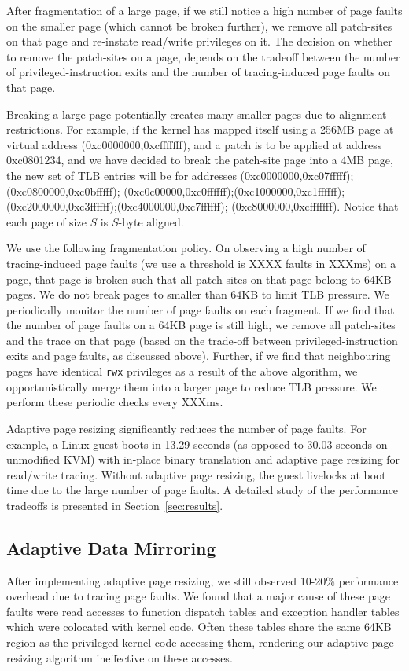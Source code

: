 \documentclass[10pt,twocolumn]{article}
\begin{document}
After fragmentation of a large page, if we still notice a high number of page faults
on the smaller page (which cannot be broken further), we remove all patch-sites
on that page and re-instate read/write privileges on it. The decision on
whether to remove the patch-sites on a page, depends on the tradeoff
between the number of privileged-instruction exits and the number of
tracing-induced page faults on that page.

Breaking a large page potentially creates
many smaller pages due to alignment restrictions.
For example, if the kernel has mapped
itself using a 256MB page at virtual address (0xc0000000,0xcfffffff), and a
patch is to be applied at address 0xc0801234, and we have decided to break
the patch-site page into a 4MB page, the new set of TLB entries will be for
addresses
(0xc0000000,0xc07fffff);(0xc0800000,0xc0bfffff);
(0xc0c00000,0xc0ffffff);(0xc1000000,0xc1ffffff);
(0xc2000000,0xc3ffffff);(0xc4000000,0xc7ffffff);
(0xc8000000,0xcfffffff). Notice that each page of size $S$ is $S$-byte
aligned.

We use the following fragmentation policy. On
observing a high number of tracing-induced page faults (we use a threshold is XXXX faults in
XXXms) on a page, that page is broken such that all patch-sites on that page
belong to 64KB pages. We do not break pages to smaller than 64KB to
limit TLB pressure. We periodically monitor the number of page faults on
each fragment. If we find that the number of page faults on a 64KB page is still high,
we remove all patch-sites and the trace on that page (based on the trade-off
between privileged-instruction exits and page faults, as discussed above).
Further, if we find that neighbouring pages have identical {\tt rwx} privileges
as a result of the above algorithm,
we opportunistically merge them into a larger page to reduce TLB pressure. We perform
these periodic checks every XXXms.

Adaptive page resizing significantly reduces the number of page faults. For
example, a Linux guest boots in 13.29 seconds (as opposed to 30.03 seconds on
unmodified KVM) with in-place binary translation
and adaptive page resizing for read/write tracing. Without adaptive page resizing,
the guest livelocks at boot time due to the large number of
page faults. A detailed study of the performance tradeoffs is presented in
Section~\ref{sec:results}.

\subsection{Adaptive Data Mirroring}
After implementing adaptive page resizing,
we still observed 10-20\% performance overhead due
to tracing page faults. We found that a major cause of these page faults were
read accesses to function dispatch tables and exception handler tables which were
colocated with kernel code. Often these tables share
the same 64KB region as the privileged kernel code accessing them, rendering our
adaptive page resizing algorithm ineffective on these accesses.
\end{document}
